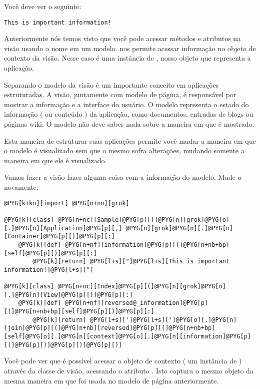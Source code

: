 \documentclass[a4paper,12pt,portuguese]{manual}
\begin{document}
Você deve ver o seguinte:

\begin{Verbatim}[commandchars=@\[\]]
This is important information!
\end{Verbatim}

Anteriormente nós temos visto que você pode acessar métodos e
atributos na visão usando o nome  em um modelo.
 nos permite acessar informação no objeto de contexto da
visão. Nesse caso é uma instância de , nosso objeto
que representa a aplicação.

Separando o modelo da visão é um importante
conceito em aplicações estruturadas. A visão, juntamente com
modelo de página, é responsável por mostrar a informação e a
interface do usuário. O modelo representa o estado do informação ( ou
conteúdo ) da aplicação, como documentos, entradas de blogs ou páginas
wiki. O modelo não deve saber nada sobre a maneira em que é mostrado.

Esta maneira de estruturar suas aplicações permite você mudar a
maneira em que o modelo é visualizado sem que o mesmo sofra
alterações, mudando somente a maneira em que ele é visualizado.

Vamos fazer a visão fazer alguma coisa com a informação do modelo.
Mude o  novamente:

\begin{Verbatim}[commandchars=@\[\]]
@PYG[k+kn][import] @PYG[n+nn][grok]

@PYG[k][class] @PYG[n+nc][Sample]@PYG[p][(]@PYG[n][grok]@PYG[o][.]@PYG[n][Application]@PYG[p][,] @PYG[n][grok]@PYG[o][.]@PYG[n][Container]@PYG[p][)]@PYG[p][:]
    @PYG[k][def] @PYG[n+nf][information]@PYG[p][(]@PYG[n+nb+bp][self]@PYG[p][)]@PYG[p][:]
        @PYG[k][return] @PYG[l+s]["]@PYG[l+s][This is important information!]@PYG[l+s]["]

@PYG[k][class] @PYG[n+nc][Index]@PYG[p][(]@PYG[n][grok]@PYG[o][.]@PYG[n][View]@PYG[p][)]@PYG[p][:]
    @PYG[k][def] @PYG[n+nf][reversed@_information]@PYG[p][(]@PYG[n+nb+bp][self]@PYG[p][)]@PYG[p][:]
        @PYG[k][return] @PYG[l+s][']@PYG[l+s][']@PYG[o][.]@PYG[n][join]@PYG[p][(]@PYG[n+nb][reversed]@PYG[p][(]@PYG[n+nb+bp][self]@PYG[o][.]@PYG[n][context]@PYG[o][.]@PYG[n][information]@PYG[p][(]@PYG[p][)]@PYG[p][)]@PYG[p][)]
\end{Verbatim}

Você pode ver que é possível acessar o objeto de contexto ( um instância
de  ) através da classe de visão, acessando o atributo
. Isto captura o mesmo objeto da mesma maneira em que foi
usada no modelo de página anteriormente.
\end{document}
